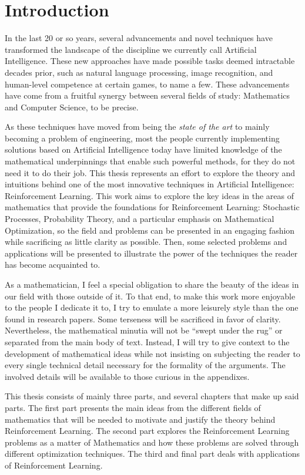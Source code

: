 \chapter*{Introduction}
\label{chapter:Intro}

In the last 20 or so years, several advancements and novel techniques have
transformed the landscape of the discipline we currently call Artificial
Intelligence. These new approaches have made possible tasks deemed intractable
decades prior, such as natural language processing, image recognition, and
human-level competence at certain games, to name a few. These advancements have
come from a fruitful synergy between several fields of study: Mathematics and
Computer Science, to be precise.

As these techniques have moved from being the \textit{state of the art} to
mainly becoming a problem of engineering, most the people currently implementing
solutions based on Artificial Intelligence today have limited knowledge of the
mathematical underpinnings that enable such powerful methods, for they do not 
need it to do their job. This thesis represents an effort to explore the theory
and intuitions behind one of the most innovative techniques in Artificial
Intelligence: Reinforcement Learning. This work aims to explore the key ideas in
the areas of mathematics that provide the foundations for Reinforcement
Learning: Stochastic Processes, Probability Theory, and a particular emphasis on
Mathematical Optimization, so the field and problems can be presented in an
engaging fashion while sacrificing as little clarity as possible. Then, some 
selected problems and applications will be presented to illustrate the power of
the techniques the reader has become acquainted to. 

As a mathematician, I feel a special obligation to share the beauty of the ideas
in our field with those outside of it. To that end, to make this work more
enjoyable to the people I dedicate it to, I try to emulate a more leisurely
style than the one found in research papers.  Some terseness will be sacrificed
in favor of clarity. Nevertheless, the mathematical minutia will not be ``swept
under the rug'' or separated from the main body of text. Instead, I will try to
give context to the development of mathematical ideas while not insisting on
subjecting the reader to every single technical detail necessary for the
formality of the arguments. The involved details will be available to those
curious in the appendixes.

This thesis consists of mainly three parts, and several chapters that make up
said parts. The first part presents the main ideas from the different fields of
mathematics that will be needed to motivate and justify the theory behind
Reinforcement Learning. The second part explores the Reinforcement Learning
problems as a matter of Mathematics and how these problems are solved through
different optimization techniques. The third and final part deals with
applications of Reinforcement Learning.

